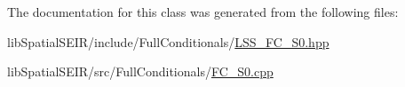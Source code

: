 The documentation for this class was generated from the following files\-:\begin{DoxyCompactItemize}
\item 
lib\-Spatial\-S\-E\-I\-R/include/\-Full\-Conditionals/\hyperlink{LSS__FC__S0_8hpp}{L\-S\-S\-\_\-\-F\-C\-\_\-\-S0.\-hpp}\item 
lib\-Spatial\-S\-E\-I\-R/src/\-Full\-Conditionals/\hyperlink{FC__S0_8cpp}{F\-C\-\_\-\-S0.\-cpp}\end{DoxyCompactItemize}
